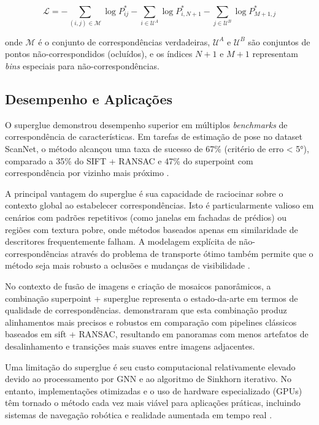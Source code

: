 \begin{equation}
\label{eq:superglue_loss}
\mathcal{L} = -\sum_{(i,j) \in \mathcal{M}} \log P^*_{ij} - \sum_{i \in \mathcal{U}^A} \log P^*_{i,N+1} - \sum_{j \in \mathcal{U}^B} \log P^*_{M+1,j}
\end{equation}

\noindent onde $\mathcal{M}$ é o conjunto de correspondências verdadeiras, $\mathcal{U}^A$ e $\mathcal{U}^B$ são conjuntos de pontos não-correspondidos (ocluídos), e os índices $N+1$ e $M+1$ representam \textit{bins} especiais para não-correspondências.

\subsection*{Desempenho e Aplicações}

O \gls{superglue} demonstrou desempenho superior em múltiplos \textit{benchmarks} de correspondência de características. Em tarefas de estimação de pose no dataset ScanNet, o método alcançou uma taxa de sucesso de 67\% (critério de erro < 5°), comparado a 35\% do SIFT + RANSAC e 47\% do \gls{superpoint} com correspondência por vizinho mais próximo \cite{Sarlin2020}.

A principal vantagem do \gls{superglue} é sua capacidade de raciocinar sobre o contexto global ao estabelecer correspondências. Isto é particularmente valioso em cenários com padrões repetitivos (como janelas em fachadas de prédios) ou regiões com textura pobre, onde métodos baseados apenas em similaridade de descritores frequentemente falham. A modelagem explícita de não-correspondências através do problema de transporte ótimo também permite que o método seja mais robusto a oclusões e mudanças de visibilidade \cite{Sarlin2020}.

No contexto de fusão de imagens e criação de mosaicos panorâmicos, a combinação \gls{superpoint} + \gls{superglue} representa o estado-da-arte em termos de qualidade de correspondências.  demonstraram que esta combinação produz alinhamentos mais precisos e robustos em comparação com pipelines clássicos baseados em \gls{sift} + RANSAC, resultando em panoramas com menos artefatos de desalinhamento e transições mais suaves entre imagens adjacentes.

Uma limitação do \gls{superglue} é seu custo computacional relativamente elevado devido ao processamento por GNN e ao algoritmo de Sinkhorn iterativo. No entanto, implementações otimizadas e o uso de hardware especializado (GPUs) têm tornado o método cada vez mais viável para aplicações práticas, incluindo sistemas de navegação robótica e realidade aumentada em tempo real \cite{Sarlin2020}.



